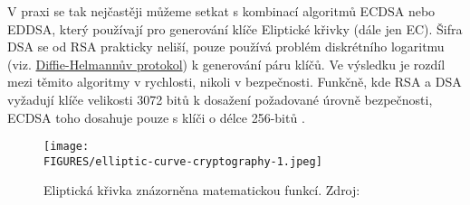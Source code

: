 V praxi se tak nejčastěji můžeme setkat s kombinací algoritmů ECDSA nebo EDDSA, který používají pro generování klíče Eliptické křivky (dále jen EC). Šifra DSA se od RSA prakticky neliší, pouze používá problém diskrétního logaritmu (viz. \hyperref[sec:diffie-hellman]{Diffie-Helmannův protokol}) k generování páru klíčů. Ve výsledku je rozdíl mezi těmito algoritmy v rychlosti, nikoli v bezpečnosti. Funkčně, kde RSA a DSA vyžadují klíče velikosti 3072 bitů k dosažení požadované úrovně bezpečnosti, ECDSA toho dosahuje pouze s klíči o délce 256-bitů \parencite{kontsevoy2020}.

\begin{figure}[htbp]
    \centering
    \texttt{[image: \\FIGURES/elliptic-curve-cryptography-1.jpeg]}
    \caption{Eliptická křivka znázorněna matematickou funkcí. Zdroj: \parencite{eliptic-curve-1}}
    \label{fig:elliptic-curve-cryptography}
  \end{figure}
\newpage
